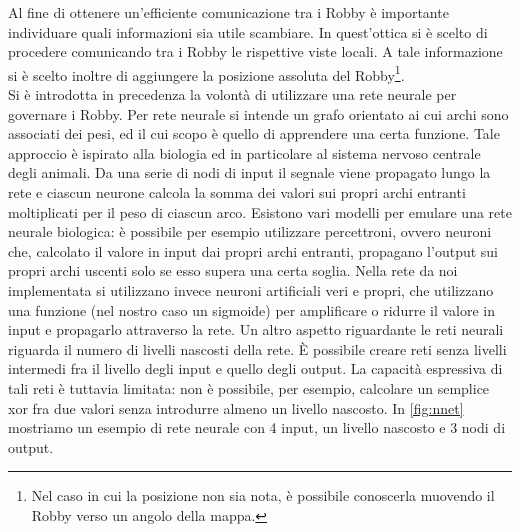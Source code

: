 Al fine di ottenere un'efficiente comunicazione tra i Robby è importante
individuare quali informazioni sia utile scambiare. In quest'ottica si è scelto
di procedere comunicando tra i Robby le rispettive viste locali. A tale
informazione si è scelto inoltre di aggiungere la posizione assoluta del
Robby\footnote{Nel caso in cui la posizione non sia nota, è possibile conoscerla
muovendo il Robby verso un angolo della mappa.}.\\



Si è introdotta in precedenza la volontà di utilizzare una rete neurale per
governare i Robby. Per rete neurale si intende un grafo orientato ai cui archi 
sono associati dei pesi, ed il cui scopo è quello di apprendere una certa 
funzione. Tale approccio è ispirato alla biologia ed in particolare al sistema 
nervoso centrale degli animali. Da una serie di nodi di input il segnale viene 
propagato lungo la rete e ciascun neurone calcola la somma dei valori sui 
propri archi entranti moltiplicati per il peso di ciascun arco. Esistono vari 
modelli per emulare una rete neurale biologica: è possibile per esempio 
utilizzare percettroni, ovvero neuroni che, calcolato il valore in input dai 
propri archi entranti, propagano l'output sui propri archi uscenti solo se esso 
supera una certa soglia. Nella rete da noi implementata si utilizzano invece 
neuroni artificiali veri e propri, che utilizzano una funzione (nel nostro caso 
un sigmoide) per amplificare o ridurre il valore in input e propagarlo 
attraverso la rete. Un altro aspetto riguardante le reti neurali riguarda il 
numero di livelli nascosti della rete. È possibile creare reti senza livelli 
intermedi fra il livello degli input e quello degli output. La capacità 
espressiva di tali reti è tuttavia limitata: non è possibile, per esempio, 
calcolare un semplice xor fra due valori senza introdurre almeno un livello 
nascosto\cite{norvigrusselai}. In \cref{fig:nnet} mostriamo un esempio di rete 
neurale con 4 input, un livello nascosto e 3 nodi di output.
\\



